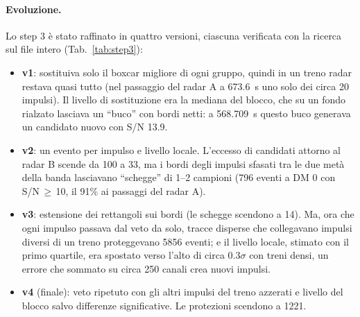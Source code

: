 \paragraph{Evoluzione.} Lo step 3 è stato raffinato in quattro versioni, ciascuna verificata con la ricerca sul file
intero (Tab.~\ref{tab:step3}):
\begin{itemize}
  \item \textbf{v1}: sostituiva solo il boxcar migliore di ogni gruppo, quindi in un treno radar restava quasi tutto
    (nel passaggio del radar A a \SI{673.6}{\second} uno solo dei circa 20 impulsi). Il livello di sostituzione era la
    mediana del blocco, che su un fondo rialzato lasciava un ``buco'' con bordi netti: a \SI{568.709}{\second} questo
    buco generava un candidato nuovo con S/N 13.9.
  \item \textbf{v2}: un evento per impulso e livello locale. L'eccesso di candidati attorno al radar B scende da 100 a 33,
    ma i bordi degli impulsi sfasati tra le due metà della banda lasciavano ``schegge'' di 1--2 campioni (796 eventi a DM 0
    con S/N\,$\geq$\,10, il 91\% ai passaggi del radar A).
  \item \textbf{v3}: estensione dei rettangoli sui bordi (le schegge scendono a 14). Ma, ora che ogni impulso passava dal
    veto da solo, tracce disperse che collegavano impulsi diversi di un treno proteggevano 5856 eventi; e il livello
    locale, stimato con il primo quartile, era spostato verso l'alto di circa $0.3\sigma$ con treni densi, un errore che
    sommato su circa 250 canali crea nuovi impulsi.
  \item \textbf{v4} (finale): veto ripetuto con gli altri impulsi del treno azzerati e livello del blocco salvo
    differenze significative. Le protezioni scendono a 1221.
\end{itemize}

